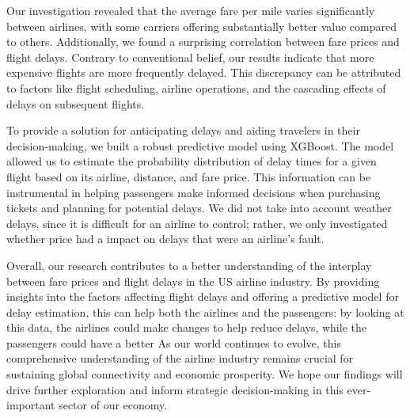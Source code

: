 \documentclass{article}
\begin{document}
    Our investigation revealed that the average fare per mile varies significantly between airlines, with some carriers offering substantially better value compared to others. Additionally, we found a surprising correlation between fare prices and flight delays. Contrary to conventional belief, our results indicate that more expensive flights are more frequently delayed. This discrepancy can be attributed to factors like flight scheduling, airline operations, and the cascading effects of delays on subsequent flights.

    To provide a solution for anticipating delays and aiding travelers in their decision-making, we built a robust predictive model using XGBoost. The model allowed us to estimate the probability distribution of delay times for a given flight based on its airline, distance, and fare price. This information can be instrumental in helping passengers make informed decisions when purchasing tickets and planning for potential delays. We did not take into account weather delays, since it is difficult for an airline to control; rather, we only investigated whether price had a impact on delays that were an airline's fault.

    Overall, our research contributes to a better understanding of the interplay between fare prices and flight delays in the US airline industry. By providing insights into the factors affecting flight delays and offering a predictive model for delay estimation, this can help both the airlines and the passengers: by looking at this data, the airlines could make changes to help reduce delays, while the passengers could have a better 
    As our world continues to evolve, this comprehensive understanding of the airline industry remains crucial for sustaining global connectivity and economic prosperity. We hope our findings will drive further exploration and inform strategic decision-making in this ever-important sector of our economy.

    
\end{document}
